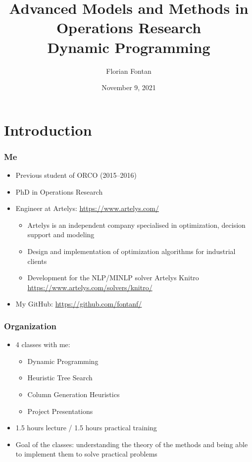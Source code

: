 \documentclass{beamer}
\author{Florian Fontan}
\title{Advanced Models and Methods in Operations Research \\ Dynamic Programming}
\date{November 9, 2021}
\begin{document}
\newcommand{\customcite}[1]{\citetitle{#1}, \citeauthor{#1}, \citeyear{#1}}


\maketitle

\section{Introduction}

\begin{frame}
  \frametitle{Me}

  \begin{itemize}
    \item Previous student of ORCO (2015--2016)
    \item PhD in Operations Research
    \item Engineer at Artelys: \url{https://www.artelys.com/}
      \begin{itemize}
        \item Artelys is an independent company specialised in optimization, decision support and modeling
        \item Design and implementation of optimization algorithms for industrial clients
        \item Development for the NLP/MINLP solver Artelys Knitro \url{https://www.artelys.com/solvers/knitro/}
      \end{itemize}
    \item My GitHub: \url{https://github.com/fontanf/}
  \end{itemize}
\end{frame}

\begin{frame}
  \frametitle{Organization}
  \begin{itemize}
    \item 4 classes with me:
      \begin{itemize}
        \item Dynamic Programming
        \item Heuristic Tree Search
        \item Column Generation Heuristics
        \item Project Presentations
      \end{itemize}
    \item 1.5 hours lecture / 1.5 hours practical training
      \item Goal of the classes: understanding the theory of the methods and being able to implement them to solve practical problems
  \end{itemize}
\end{frame}
\end{document}
